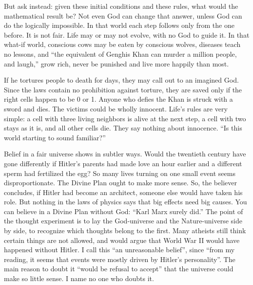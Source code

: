 But ask instead: given these initial conditions and these rules, what would the mathematical result be? Not even God can change that answer, unless God can do the logically impossible. In that world each step follows only from the one before. It is not fair. Life may or may not evolve, with no God to guide it. In that what-if world, conscious cows may be eaten by conscious wolves, diseases teach no lessons, and ``the equivalent of Genghis Khan can murder a million people, and laugh,'' grow rich, never be punished and live more happily than most.

If he tortures people to death for days, they may call out to an imagined God. Since the laws contain no prohibition against torture, they are saved only if the right cells happen to be 0 or 1. Anyone who defies the Khan is struck with a sword and dies. The victims could be wholly innocent. Life's rules are very simple: a cell with three living neighbors is alive at the next step, a cell with two stays as it is, and all other cells die. They say nothing about innocence. ``Is this world starting to sound familiar?'' 

Belief in a fair universe shows in subtler ways. Would the twentieth century have gone differently if Hitler's parents had made love an hour earlier and a different sperm had fertilized the egg? So many lives turning on one small event seems disproportionate. The Divine Plan ought to make more sense. So, the believer concludes, if Hitler had become an architect, someone else would have taken his role. But nothing in the laws of physics says that big effects need big causes. You can believe in a Divine Plan without God: ``Karl Marx surely did.''  The point of the thought experiment is to lay the God-universe and the Nature-universe side by side, to recognize which thoughts belong to the first. Many atheists still think certain things are not allowed, and would argue that World War II would have happened without Hitler. I call this ``an unreasonable belief'', since ``from my reading, it seems that events were mostly driven by Hitler's personality''.  The main reason to doubt it ``would be refusal to accept'' that the universe could make so little sense. I name no one who doubts it. 

